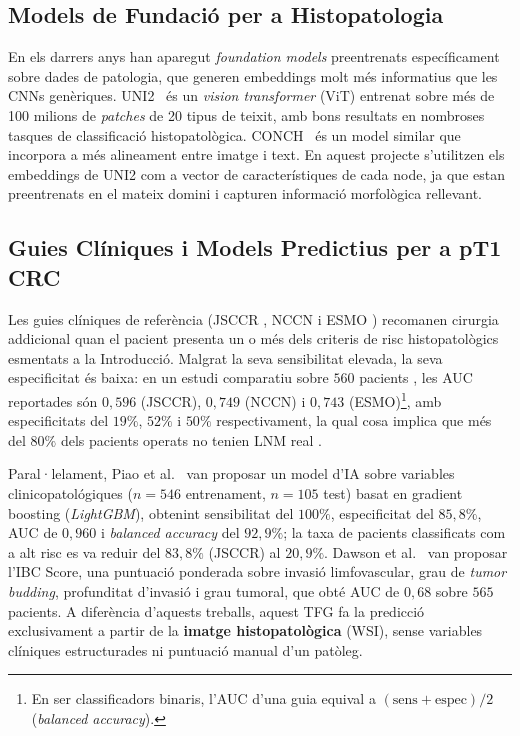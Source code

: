 \documentclass[10pt,a4paper,twocolumn,twoside]{article}
\begin{document}
\subsection{Models de Fundació per a Histopatologia}

En els darrers anys han aparegut \textit{foundation models} preentrenats específicament
sobre dades de patologia, que generen embeddings molt més informatius que les CNNs
genèriques. UNI2~\cite{chen2024uni2} és un \textit{vision transformer} (ViT) entrenat sobre
més de 100 milions de \textit{patches} de 20 tipus de teixit, amb bons resultats en
nombroses tasques de classificació histopatològica. CONCH~\cite{lu2024conch} és un model
similar que incorpora a més alineament entre imatge i text. En aquest projecte s'utilitzen
els embeddings de UNI2 com a vector de característiques de cada node, ja que estan
preentrenats en el mateix domini i capturen informació morfològica rellevant.

\subsection{Guies Clíniques i Models Predictius per a pT1 CRC}
\label{sec:guidelines-sota}

Les guies clíniques de referència (JSCCR \cite{jsccr2019}, NCCN i
ESMO \cite{esge2022}) recomanen cirurgia addicional quan el pacient
presenta un o més dels criteris de risc histopatològics esmentats a la
Introducció. Malgrat la seva sensibilitat elevada, la seva especificitat
és baixa: en un estudi comparatiu sobre $560$ pacients
\cite{tanino2024comparative}, les AUC reportades són $0{,}596$ (JSCCR),
$0{,}749$ (NCCN) i $0{,}743$ (ESMO)\footnote{En ser classificadors binaris, l'AUC
d'una guia equival a $(\text{sens}+\text{espec})/2$ (\textit{balanced accuracy}).},
amb especificitats del $19\%$, $52\%$
i $50\%$ respectivament, la qual cosa implica que més del $80\%$ dels
pacients operats no tenien LNM real \cite{tanino2024comparative,zaffalon2023}.

Paral·lelament, Piao et al.~\cite{piao2023ai} van proposar un model
d'IA sobre variables clinicopatológiques ($n\!=\!546$ entrenament,
$n\!=\!105$ test) basat en gradient boosting (\textit{LightGBM}),
obtenint sensibilitat del $100\%$, especificitat del $85{,}8\%$, AUC de
$0{,}960$ i \textit{balanced accuracy} del $92{,}9\%$; la taxa de
pacients classificats com a alt risc es va reduir del $83{,}8\%$ (JSCCR)
al $20{,}9\%$. Dawson et al.~\cite{dawson2024budding} van proposar
l'IBC Score, una puntuació ponderada sobre invasió limfovascular, grau de
\textit{tumor budding}, profunditat d'invasió i grau tumoral,
que obté AUC de $0{,}68$ sobre $565$ pacients. A diferència d'aquests
treballs, aquest TFG fa la predicció exclusivament a partir de la
\textbf{imatge histopatològica} (WSI), sense variables clíniques
estructurades ni puntuació manual d'un patòleg.
\end{document}
